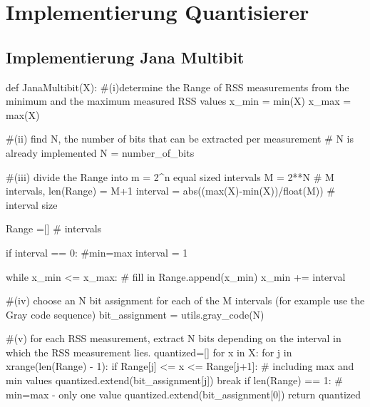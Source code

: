\section{Implementierung Quantisierer}


\subsection{Implementierung Jana Multibit}
\begin{python}
	def JanaMultibit(X):
		#(i)determine the Range of RSS measurements from the minimum and the maximum measured RSS values
		x_min = min(X)
		x_max = max(X)

		#(ii) find N, the number of bits that can be extracted per measurement
		# N is already implemented
		N = number_of_bits

		#(iii) divide the Range into m = 2^n equal sized intervals
		M = 2**N	# M intervals, len(Range) = M+1
		interval = abs((max(X)-min(X))/float(M)) # interval size
		
		Range =[] 	# intervals
		
		if interval == 0:	#min=max
			interval = 1

		while x_min <= x_max:	# fill in
			Range.append(x_min) 
			x_min += interval

		#(iv) choose an N bit assignment for each of the M intervals (for example use the Gray code sequence) 
		bit_assignment = utils.gray_code(N)

		#(v) for each RSS measurement, extract N bits depending on the interval in which the RSS measurement lies. 
		quantized=[]
		for x in X:
			for j in xrange(len(Range) - 1):
				if Range[j] <= x <= Range[j+1]: # including max and min values
					quantized.extend(bit_assignment[j])
					break
			if len(Range) == 1:	# min=max - only one value
				quantized.extend(bit_assignment[0])
		return quantized
\end{python}
